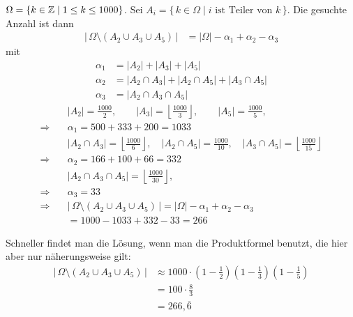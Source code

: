 \begin{loesung}
$\Omega = \{k \in \mathbb{Z} \mid 1 \le k \le 1000\}$. Sei $A_i = \{\, k \in \Omega \mid i \text{ ist Teiler von } k \,\}$.
Die gesuchte Anzahl ist dann
\begin{align*}
|\,\Omega \setminus (A_2 \cup A_3 \cup A_5)\,| &= |\Omega| - \alpha_1 + \alpha_2 - \alpha_3
\end{align*}
mit
\begin{align*}
\alpha_1 &= |A_2| + |A_3| + |A_5|\\
\alpha_2 &= |A_2 \cap A_3| + |A_2 \cap A_5| + |A_3 \cap A_5|\\
\alpha_3 &= |A_2 \cap A_3 \cap A_5|
\end{align*}
\begin{align*}
&|A_2| = \frac{1000}{2}, \qquad |A_3| = \left\lfloor \frac{1000}{3} \right\rfloor, \qquad |A_5| = \frac{1000}{5},\\
\Rightarrow\quad &\alpha_1 = 500 + 333 + 200 = 1033\\
&|A_2 \cap A_3| = \left\lfloor \frac{1000}{6} \right\rfloor, \quad |A_2 \cap A_5| = \frac{1000}{10}, \quad |A_3 \cap A_5| = \left\lfloor \frac{1000}{15} \right\rfloor\\
\Rightarrow\quad &\alpha_2 = 166 + 100 + 66 = 332\\
&|A_2 \cap A_3 \cap A_5| = \left\lfloor \frac{1000}{30} \right\rfloor,\\
\Rightarrow\quad &\alpha_3 = 33\\
\Rightarrow\quad &|\,\Omega \setminus (A_2 \cup A_3 \cup A_5)\,| = |\Omega| - \alpha_1 + \alpha_2 - \alpha_3\\
&= 1000 - 1033 + 332 - 33 = 266
\end{align*}

Schneller findet man die Lösung, wenn man die Produktformel benutzt, die hier aber nur näherungsweise gilt:
\begin{align*}
|\,\Omega \setminus (A_2 \cup A_3 \cup A_5)\,| &\approx 1000 \cdot \left(1 - \frac{1}{2}\right)\left(1 - \frac{1}{3}\right)\left(1 - \frac{1}{5}\right)\\
&= 100 \cdot \frac{8}{3}\\
&= 266{,}\overline{6}
\end{align*}
\end{loesung}

